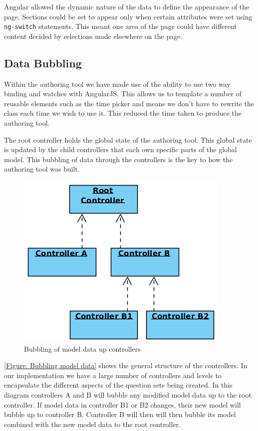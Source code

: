 Angular allowed the dynamic nature of the data to define the appearance of the page. Sections could be set to appear only when certain attributes were set using \lstinline|ng-switch| statements. This meant one area of the page could have different content decided by selections made elsewhere on the page.

\subsection{Data Bubbling}
\label{Section:Authoring_Data_bubbling}

Within the authoring tool we have made use of the ability to use two way binding and watches with AngularJS. This allows us to template a number of reusable elements such as the time picker and means we don't have to rewrite the class each time we wish to use it. This reduced the time taken to produce the authoring tool.

The root controller holds the global state of the authoring tool. This global state is updated by the child controllers that each own specific parts of the global model. This bubbling of data through the controllers is the key to how the authoring tool was built.

\begin{figure}[h]
	\centering
		\includegraphics[scale=0.4]{../figures/authoring_tool/controller_bubbling.png} 		
	\caption{\label{Figure: Bubbling model data} Bubbling of model data up controllers} 	
\end{figure}

\autoref{Figure: Bubbling model data} shows the general structure of the controllers. In our implementation we have a large number of controllers and levels to encapsulate the different aspects of the question sets being created. In this diagram controllers A and B will bubble any modified model data up to the root controller. If model data in controller B1 or B2 changes, their new model will bubble up to controller B. Controller B will then will then bubble its model combined with the new model data to the root controller.


